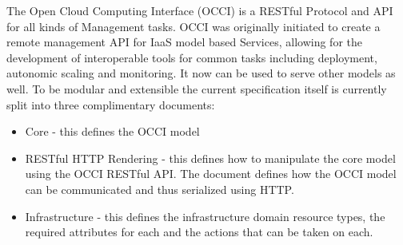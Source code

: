 The Open Cloud Computing Interface (OCCI) is a RESTful Protocol and
API for all kinds of Management tasks. OCCI was originally initiated
to create a remote management API for IaaS model based Services,
allowing for the development of interoperable tools for common tasks
including deployment, autonomic scaling and monitoring. It now can be
used to serve other models as well. To be modular and extensible the
current specification itself is currently split into three
complimentary documents:

\begin{itemize}
\item Core - this defines the OCCI model
\item RESTful HTTP Rendering - this defines how to manipulate the core model
  using the OCCI RESTful API. The document defines how the OCCI model
  can be communicated and thus serialized using HTTP.
\item Infrastructure - this defines the infrastructure domain resource
  types, the required attributes for each and the actions that can be
  taken on each.
\end{itemize}

